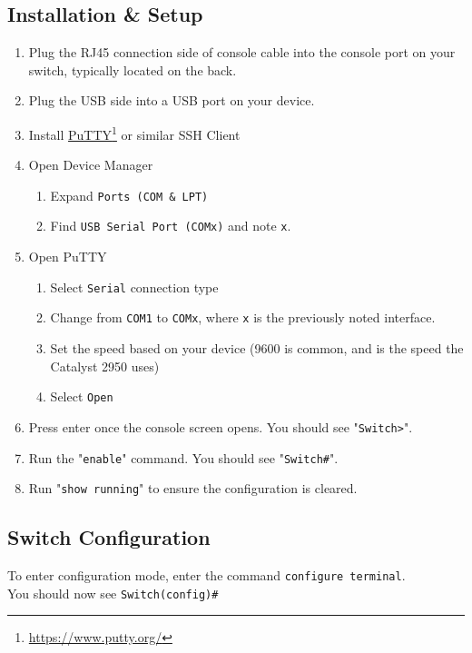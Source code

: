 \documentclass{ol-softwaremanual}
\newcommand{\doclink}[2]{\href{#1}{#2}\footnote{\url{#1}}}
\begin{document}
        \subsection{Installation \& Setup}\label{subsec:installation}
        \begin{enumerate}
            \item Plug the RJ45 connection side of console cable into the console port on your switch, typically located on the back.
            \item Plug the USB side into a USB port on your device.
            \item Install \doclink{https://www.putty.org/}{PuTTY} or similar SSH Client
            \item Open Device Manager
                \begin{enumerate}
                    \item Expand \verb|Ports (COM & LPT)|
                    \item Find \verb|USB Serial Port (COMx)| and note \verb|x|.
                \end{enumerate}
            \item Open PuTTY
                \begin{enumerate}
                    \item Select \verb|Serial| connection type
                    \item Change from \verb|COM1| to \verb|COMx|, where \verb|x| is the previously noted interface.
                    \item Set the speed based on your device (9600 is common, and is the speed the Catalyst 2950 uses)
                    \item Select \verb|Open|
                \end{enumerate}
            \item Press enter once the console screen opens.
            You should see "\verb|Switch>|".
            \item Run the "\verb|enable|" command.
            You should see "\verb|Switch#|".
            \item Run "\verb|show running|" to ensure the configuration is cleared.
        \end{enumerate}
        \subsection{Switch Configuration}\label{subsec:config}
        To enter configuration mode, enter the command \verb|configure terminal|.\\
        You should now see \verb|Switch(config)#|
\end{document}
